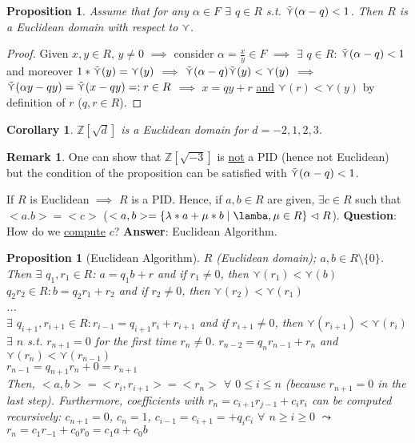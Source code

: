 \documentclass[11pt]{article}
\newtheorem{prop}[thm]{Proposition}
\newtheorem{cor}[thm]{Corollary}
\theoremstyle{definition}
\newtheorem{remark}[thm]{Remark}
\numberwithin{equation}{section}
\newcommand{\Z}{\mathbb{Z}}
\begin{document}
\begin{prop}
Assume that for any $\alpha \in F$ $\exists$ $q \in R$ s.t. \underline{$\Tilde{\curlyvee}(\alpha - q) < 1$}. Then $R$ is a Euclidean domain with respect to $\curlyvee$.
\end{prop}

\begin{proof}
Given $x, y \in R$, $y \neq 0$ $\implies$ consider $\alpha = \frac{x}{y} \in F$ $\implies$ $\exists$ $q \in R$: $\Tilde{\curlyvee}(\alpha - q) < 1$ and moreover $1*\Tilde{\curlyvee}(y) = \curlyvee(y)$ $\implies$ $\Tilde{\curlyvee}(\alpha - q)\Tilde{\curlyvee}(y) < \curlyvee(y)$ $\implies$ $\Tilde{\curlyvee}(\alpha y - qy) = \Tilde{\curlyvee}(x - qy) =: r \in R$ $\implies$ $x = qy+r$ \underline{and} \underline{$\curlyvee(r) < \curlyvee(y)$} by definition of $r$ ($q, r \in R$).
\end{proof}

\begin{cor}
$\Z[\sqrt{d}]$ is a Euclidean domain for $d = -2, 1, 2, 3$.
\end{cor}

\begin{remark}
One can show that $\Z[\sqrt{-3}]$ is \underline{not} a PID (hence not Euclidean) but the condition of the proposition can be satisfied with $\Tilde{\curlyvee}(\alpha - q) < 1$.
\end{remark}

If $R$ is Euclidean $\implies$ $R$ is a PID. Hence, if $a, b \in R$ are given, $\exists c \in R$ such that $<a. b> = <c>$ ($<a, b> = \{\lambda*a + \mu*b \mid \lamba, \mu \in R\} \vartriangleleft R$). \textbf{Question}: How do we \underline{compute} $c$? \textbf{Answer}: Euclidean Algorithm.

\begin{prop}[Euclidean Algorithm]
$R$ (Euclidean domain); $a, b \in R \setminus \{0\}$.\\
Then $\exists$ $q_{1}, r_{1} \in R$: $a = q_{1}b+r$ and if $r_{1} \neq 0$, then $\curlyvee(r_{1}) < \curlyvee(b)$\\
$q_{2}r_{2} \in R: b = q_{2}r_{1}+r_{2}$ and if $r_{2} \neq 0$, then $\curlyvee(r_{2})<\curlyvee(r_{1})$\\
...\\
$\exists$ $q_{i+1}, r_{i+1} \in R: r_{i-1} = q_{i+1}r_{i}+r_{i+1}$ and if $r_{i+1} \neq 0$, then $\curlyvee(r_{i+1}) < \curlyvee(r_{i})$\\
$\exists$ $n$ s.t. $r_{n+1} = 0$ for the first time $r_{n} \neq 0$. $r_{n-2} = q_{n}r_{n-1}+r_{n}$ and $\curlyvee(r_{n})<\curlyvee(r_{n-1})$\\
$r_{n-1} = q_{n+1}r_{n} + 0 = r_{n+1}$\\
Then, $<a, b> = <r_{i}, r_{i+1}> = <r_{n}>$ $\forall$ $0 \leq i \leq n$ (because $r_{n+1} = 0$ in the last step).  Furthermore, coefficients with $r_{n} = c_{i+1}r_{j-1}+c_{i}r_{i}$ can be computed recursively: $c_{n+1} = 0$, $c_{n} = 1$, $c_{i-1} = c_{i+1} = + q_{i}c_{i}$ $\forall$ $n \geq i \geq 0$ $\leadsto$ $r_{n} = c_{1}r_{-1}+c_{0}r_{0} = c_{1}a+c_{0}b$
\end{prop}
\end{document}
